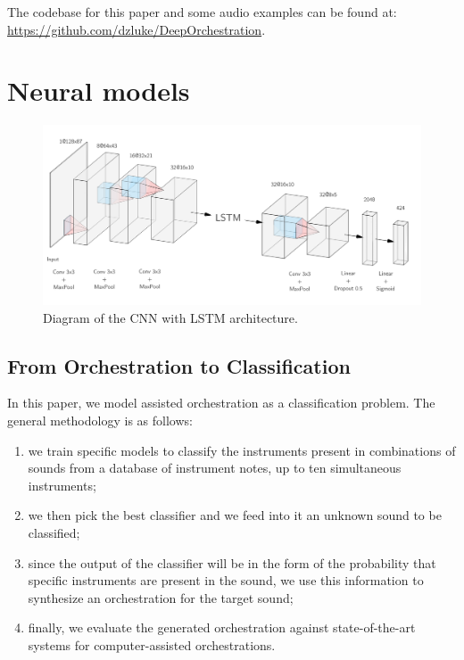 \documentclass[runningheads,a4paper]{llncs}
\begin{document}
The codebase for this paper and some audio examples can be found at: \url{https://github.com/dzluke/DeepOrchestration}.


\section{Neural models}
\label{sec:models}


\begin{figure}
	\centering
	\includegraphics[scale=0.22]{../ISMIR_2020/figs/CNN_LSTM_diagram.png}
	\caption{Diagram of the CNN with LSTM architecture. \label{cnn_lstm}}
\end{figure}

\subsection{From Orchestration to Classification}

In this paper, we model assisted orchestration as a classification problem. The general methodology is as follows:
\begin{enumerate}
\item we train specific models to classify the instruments present in combinations of sounds from a database of instrument notes, up to ten simultaneous instruments;
\item we then pick the best classifier and we feed into it an unknown sound to be classified;
\item since the output of the classifier will be in the form of the probability that specific instruments are present in the sound, we use this information to synthesize an orchestration for the target sound;
\item finally, we evaluate the generated orchestration against state-of-the-art systems for computer-assisted orchestrations.
\end{enumerate}
\end{document}
